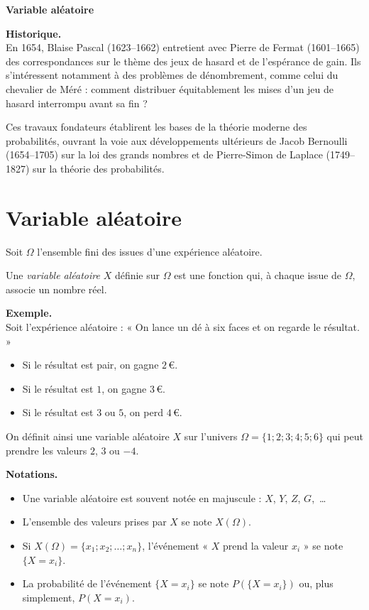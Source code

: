\documentclass[11pt]{article}
\newenvironment{exemple}{\par\smallskip\noindent\textbf{Exemple. \\}\ignorespaces}{\par\smallskip}
\newenvironment{historique}{\par\smallskip\noindent\textbf{Historique. \\}\ignorespaces}{\par\smallskip}
\newenvironment{notations}{\par\smallskip\noindent\textbf{Notations. \\}\ignorespaces}{\par\smallskip}
\begin{document}
\begin{definition}
\begin{center}
    {\Huge\bfseries Variable aléatoire}
\end{center}
\end{definition}

\begin{historique}
En 1654, Blaise Pascal (1623--1662) entretient avec Pierre de Fermat (1601--1665) des correspondances sur le thème des jeux de hasard et de l'espérance de gain. Ils s'intéressent notamment à des problèmes de dénombrement, comme celui du chevalier de Méré : comment distribuer équitablement les mises d'un jeu de hasard interrompu avant sa fin ?

Ces travaux fondateurs établirent les bases de la théorie moderne des probabilités, ouvrant la voie aux développements ultérieurs de Jacob Bernoulli (1654--1705) sur la loi des grands nombres et de Pierre-Simon de Laplace (1749--1827) sur la théorie des probabilités.
\end{historique}

\section{Variable aléatoire}

\begin{definition}
Soit $\Omega$ l'ensemble fini des issues d'une expérience aléatoire.

Une \emph{variable aléatoire} $X$ définie sur $\Omega$ est une fonction qui, à chaque issue de $\Omega$, associe un nombre réel.
\end{definition}

\begin{exemple}
Soit l'expérience aléatoire : « On lance un dé à six faces et on regarde le résultat. »
\begin{itemize}
    \item Si le résultat est pair, on gagne $2\,€$.
    \item Si le résultat est $1$, on gagne $3\,€$.
    \item Si le résultat est $3$ ou $5$, on perd $4\,€$.
\end{itemize}
On définit ainsi une variable aléatoire $X$ sur l'univers $\Omega=\{1;2;3;4;5;6\}$ qui peut prendre les valeurs $2$, $3$ ou $-4$.
\end{exemple}

\begin{notations}
\begin{itemize}
    \item Une variable aléatoire est souvent notée en majuscule : $X$, $Y$, $Z$, $G$, \,\ldots
    \item L'ensemble des valeurs prises par $X$ se note $X(\Omega)$.
    \item Si $X(\Omega)=\{x_1;x_2;\ldots;x_n\}$, l'événement « $X$ prend la valeur $x_i$ » se note $\{X=x_i\}$.
    \item La probabilité de l'événement $\{X=x_i\}$ se note $P(\{X=x_i\})$ ou, plus simplement, $P(X=x_i)$.
\end{itemize}
\end{notations}
\end{document}
